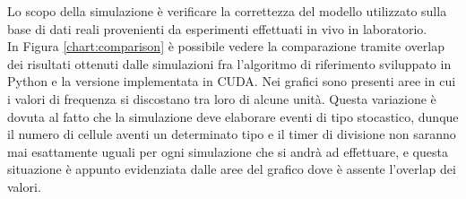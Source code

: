 Lo scopo della simulazione è verificare la correttezza del modello utilizzato
sulla base di dati reali provenienti da esperimenti effettuati in vivo
in laboratorio.
\\
In Figura \ref{chart:comparison} è possibile vedere la comparazione tramite 
overlap dei
risultati ottenuti dalle simulazioni fra l'algoritmo di riferimento sviluppato
in Python e la versione implementata in CUDA.
Nei grafici sono presenti aree in cui
i valori di frequenza si discostano tra loro di alcune unità. Questa variazione
è dovuta al fatto che la simulazione deve elaborare eventi di tipo stocastico,
dunque il numero di cellule aventi un determinato tipo e il timer di divisione
non saranno mai esattamente uguali per ogni simulazione che si andrà ad
effettuare, e questa situazione è appunto evidenziata dalle aree del grafico
dove è assente l'overlap dei valori. 
